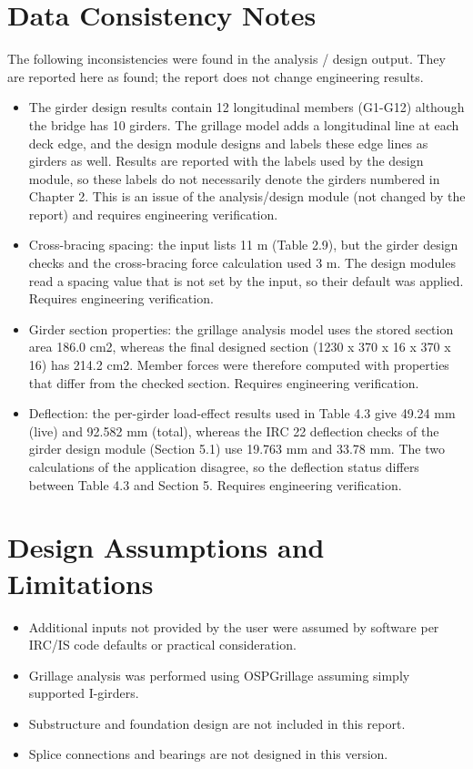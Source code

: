 \documentclass[12pt,a4paper]{report}
\numberwithin{table}{chapter}
\numberwithin{figure}{chapter}
\begin{document}
\section*{Data Consistency Notes}
The following inconsistencies were found in the analysis / design output. They are reported here as found; the report does not change engineering results.
\begin{itemize}
\item The girder design results contain 12 longitudinal members (G1-G12) although the bridge has 10 girders. The grillage model adds a longitudinal line at each deck edge, and the design module designs and labels these edge lines as girders as well. Results are reported with the labels used by the design module, so these labels do not necessarily denote the girders numbered in Chapter 2. This is an issue of the analysis/design module (not changed by the report) and requires engineering verification.
\item Cross-bracing spacing:\allowbreak{} the input lists 11 m (Table 2.9), but the girder design checks and the cross-bracing force calculation used 3 m. The design modules read a spacing value that is not set by the input, so their default was applied. Requires engineering verification.
\item Girder section properties:\allowbreak{} the grillage analysis model uses the stored section area 186.0 cm2, whereas the final designed section (1230 x 370 x 16 x 370 x 16) has 214.2 cm2. Member forces were therefore computed with properties that differ from the checked section. Requires engineering verification.
\item Deflection:\allowbreak{} the per-girder load-effect results used in Table 4.3 give 49.24 mm (live) and 92.582 mm (total), whereas the IRC 22 deflection checks of the girder design module (Section 5.1) use 19.763 mm and 33.78 mm. The two calculations of the application disagree, so the deflection status differs between Table 4.3 and Section 5. Requires engineering verification.
\end{itemize}

\section*{Design Assumptions and Limitations}
\label{sec:assumptions}

\begin{itemize}
\item Additional inputs not provided by the user were assumed by software per IRC/IS code defaults or practical consideration.
\item Grillage analysis was performed using OSPGrillage assuming simply supported I-girders.
\item Substructure and foundation design are not included in this report.
\item Splice connections and bearings are not designed in this version.
\end{itemize}
\end{document}
